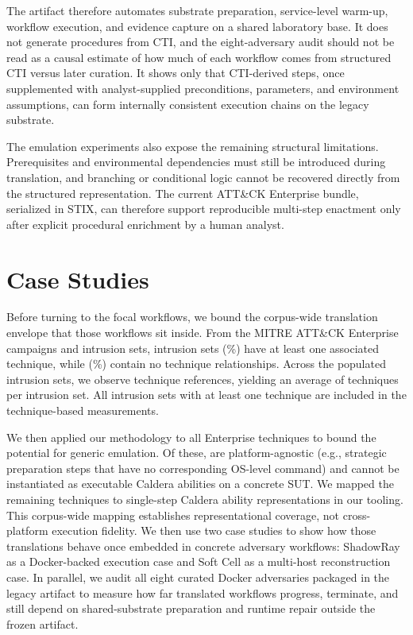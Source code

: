 \documentclass[sigconf]{acmart}
\newcommand{\stix}{STIX\xspace}
\newcommand{\mitre}{MITRE\xspace}
\newcommand{\attack}{ATT\&CK\xspace}
\newcommand{\caldera}{Caldera\xspace}
\begin{document}
The artifact therefore automates substrate preparation, service-level warm-up, workflow execution, and evidence capture on a shared laboratory base. It does not generate procedures from CTI, and the eight-adversary audit should not be read as a causal estimate of how much of each workflow comes from structured CTI versus later curation. It shows only that CTI-derived steps, once supplemented with analyst-supplied preconditions, parameters, and environment assumptions, can form internally consistent execution chains on the legacy substrate.

The emulation experiments also expose the remaining structural limitations. Prerequisites and environmental dependencies must still be introduced during translation, and branching or conditional logic cannot be recovered directly from the structured representation. The current \attack{} Enterprise bundle, serialized in \stix{}, can therefore support reproducible multi-step enactment only after explicit procedural enrichment by a human analyst.

\section{Case Studies}
\label{sec:casestudies}

Before turning to the focal workflows, we bound the corpus-wide translation envelope that those workflows sit inside. From the \nCampaigns{} \mitre{} \attack{} Enterprise campaigns and \nIntrusionSets{} intrusion sets, \nIntrusionSetsWithTechniques{} intrusion sets (\intrusionSetWithTechniquesPct\%) have at least one associated technique, while \nIntrusionSetsEmpty{} (\intrusionSetEmptyPct\%) contain no technique relationships. Across the populated intrusion sets, we observe \intrusionSetTechRefs{} technique references, yielding an average of \intrusionSetTechAvg{} techniques per intrusion set. All intrusion sets with at least one technique are included in the technique-based measurements.

We then applied our methodology to all \nTechniquesAnalysis{} Enterprise techniques to bound the potential for generic emulation. Of these, \nPlatformAgnosticTechniques{} are platform-agnostic (e.g., strategic preparation steps that have no corresponding OS-level command) and cannot be instantiated as executable \caldera{} abilities on a concrete SUT. We mapped the remaining \nTranslatableTechniques{} techniques to single-step \caldera{} ability representations in our tooling. This corpus-wide mapping establishes representational coverage, not cross-platform execution fidelity. We then use two case studies to show how those translations behave once embedded in concrete adversary workflows: ShadowRay as a Docker-backed execution case and Soft Cell as a multi-host reconstruction case. In parallel, we audit all eight curated Docker adversaries packaged in the legacy artifact to measure how far translated workflows progress, terminate, and still depend on shared-substrate preparation and runtime repair outside the frozen artifact.
\end{document}
